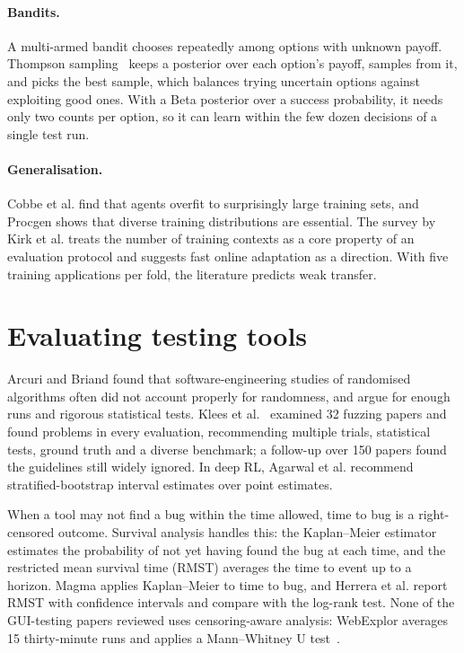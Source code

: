 \paragraph{Bandits.} A multi-armed bandit chooses repeatedly among options with unknown
payoff. Thompson sampling~\cite{russo2018tutorial} keeps a posterior
over each option's payoff, samples from it, and picks the best sample, which balances trying
uncertain options against exploiting good ones. With a Beta posterior over a success
probability, it needs only two counts per option, so it can learn within the few dozen
decisions of a single test run.

\paragraph{Generalisation.} Cobbe et al. find that agents
overfit to surprisingly large training sets, and Procgen shows that
diverse training distributions are essential. The survey by Kirk et al.
treats the number of training contexts as a core property of an evaluation protocol and
suggests fast online adaptation as a direction. With five training applications per fold,
the literature predicts weak transfer.

\section{Evaluating testing tools}
\label{sec:bg-eval}

Arcuri and Briand found that software-engineering studies of
randomised algorithms often did not account properly for randomness, and argue for enough
runs and rigorous statistical tests. Klees et al.~\cite{klees2018evaluating} examined 32
fuzzing papers and found problems in every evaluation, recommending multiple trials,
statistical tests, ground truth and a diverse benchmark; a follow-up over 150 papers found
the guidelines still widely ignored. In deep RL, Agarwal
et al. recommend stratified-bootstrap interval estimates over
point estimates.

When a tool may not find a bug within the time allowed, time to bug is a right-censored
outcome. Survival analysis handles this: the Kaplan--Meier
estimator estimates the probability of not yet having found
the bug at each time, and the restricted mean survival time (RMST)
averages the time to event up to a horizon. Magma applies Kaplan--Meier to time to
bug, and Herrera et al. report RMST with
confidence intervals and compare with the log-rank test. None of the GUI-testing papers
reviewed uses censoring-aware analysis: WebExplor averages 15 thirty-minute runs and applies
a Mann--Whitney U test~\cite{zheng2021webexplor}.

